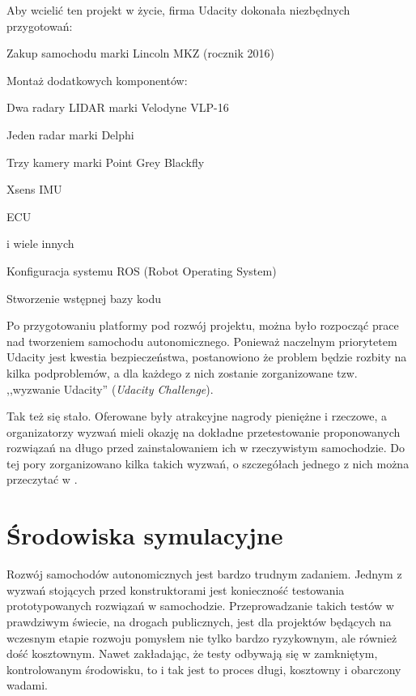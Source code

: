 Aby wcielić ten projekt w życie, firma Udacity dokonała niezbędnych przygotowań:
\begin{enumerate*}
\item Zakup samochodu marki Lincoln MKZ (rocznik 2016)
\item Montaż dodatkowych komponentów:
\begin{itemize*}
\item Dwa radary LIDAR marki Velodyne VLP-16
\item Jeden radar marki Delphi
\item Trzy kamery marki Point Grey Blackfly
\item Xsens IMU \cite{imu:wikipedia}
\item ECU \cite{ecu:wikipedia}
\item i wiele innych
\end{itemize*}
\item Konfiguracja systemu ROS (Robot Operating System) \cite{ros:about}
\item Stworzenie wstępnej bazy kodu
\end{enumerate*}

Po przygotowaniu platformy pod rozwój projektu, można było rozpocząć prace nad tworzeniem samochodu autonomicznego. Ponieważ naczelnym priorytetem Udacity jest kwestia bezpieczeństwa, postanowiono że problem będzie rozbity na kilka podproblemów, a dla każdego z nich zostanie zorganizowane tzw. ,,wyzwanie Udacity'' (\textit{Udacity Challenge}).

Tak też się stało. Oferowane były atrakcyjne nagrody pieniężne i rzeczowe, a organizatorzy wyzwań mieli okazję na dokładne przetestowanie proponowanych rozwiązań na długo przed zainstalowaniem ich w rzeczywistym samochodzie. Do tej pory zorganizowano kilka takich wyzwań, o szczegółach jednego z nich można przeczytać w \cite{udacity:challenge2}.

\section{Środowiska symulacyjne}
\vspace{0.5cm}
Rozwój samochodów autonomicznych jest bardzo trudnym zadaniem. Jednym z wyzwań stojących przed konstruktorami jest konieczność testowania prototypowanych rozwiązań w samochodzie. Przeprowadzanie takich testów w prawdziwym świecie, na drogach publicznych, jest dla projektów będących na wczesnym etapie rozwoju pomysłem nie tylko bardzo ryzykownym, ale również dość kosztownym. Nawet zakładając, że testy odbywają się w zamkniętym, kontrolowanym środowisku, to i tak jest to proces długi, kosztowny i obarczony wadami.

